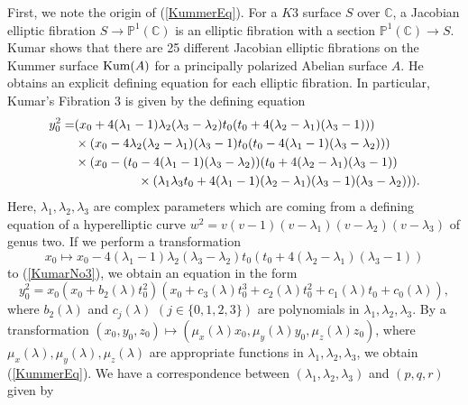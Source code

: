 \documentclass[10pt]{article}
\begin{document}
First, we note the origin of (\ref{KummerEq}).
For a $K3$ surface $S$ over $\mathbb{C}$,
a Jacobian elliptic fibration $S\rightarrow \mathbb{P}^1(\mathbb{C})$ is an elliptic fibration with  a section $\mathbb{P}^1(\mathbb{C}) \rightarrow S$.
Kumar \cite{Kumar} shows that there are 25 different Jacobian elliptic fibrations on the Kummer surface ${\rm Kum}(A)$ for a principally polarized Abelian surface $A$.
He obtains an explicit defining equation for each elliptic fibration.
In particular,
Kumar's Fibration 3 is given by the defining equation
\begin{align}\label{KumarNo3}
y_0^2 = &(x_0 + 4 (\lambda_1 - 1) \lambda_2 (\lambda_3 - \lambda_2) t_0 (t_0 + 4 (\lambda_2 - \lambda_1) (\lambda_3 - 1)))\notag\\
 &\times (x_0 -  4 \lambda_2 (\lambda_2 - \lambda_1) (\lambda_3 - 1) t_0 (t_0 - 4 (\lambda_1 - 1) (\lambda_3 - \lambda_2))) \notag \\
&\times (x_0 - (t_0 - 4 (\lambda_1 - 1) (\lambda_3 - \lambda_2))(t_0 + 4 (\lambda_2 - \lambda_1) (\lambda_3 - 1)) \notag  \\
&\quad \quad\quad\quad\quad \times (\lambda_1 \lambda_3 t_0 + 4 (\lambda_1 - 1) (\lambda_2 - \lambda_1) (\lambda_3 - 1) (\lambda_3 - \lambda_2))).
\end{align}
Here,
$\lambda_1,\lambda_2,\lambda_3$ are complex parameters
which are coming from a defining equation of a hyperelliptic curve $w^2 =v (v-1)(v-\lambda_1)(v-\lambda_2)(v-\lambda_3)$
of genus two.
If we perform a transformation 
$$
x_0 \mapsto x_0 -4 (\lambda_1 - 1) \lambda_2 (\lambda_3 - \lambda_2) t_0 (t_0 + 4 (\lambda_2 - \lambda_1) (\lambda_3 - 1))
$$
to (\ref{KumarNo3}),
we obtain an equation in the form
$$
y_0^2=x_0 \left(x_0+ b_2(\lambda) t_0^2 \right) \left(x_0+c_3(\lambda) t_0^3 + c_2(\lambda) t_0^2 + c_1(\lambda) t_0+ c_0(\lambda) \right),
$$
where $b_2(\lambda)$ and $c_j(\lambda)$ $(j\in\{0,1,2,3\})$ are polynomials in $\lambda_1,\lambda_2,\lambda_3$.
By a transformation $(x_0,y_0,z_0) \mapsto (\mu_x(\lambda)x_0, \mu_y (\lambda)y_0, \mu_z (\lambda) z_0)$,
where $\mu_x(\lambda), \mu_y(\lambda),\mu_z(\lambda)$ are appropriate functions in $\lambda_1, \lambda_2, \lambda_3$,
we obtain (\ref{KummerEq}).
We have a correspondence between $(\lambda_1,\lambda_2,\lambda_3)$ and $(p,q,r)$ given by
\end{document}

